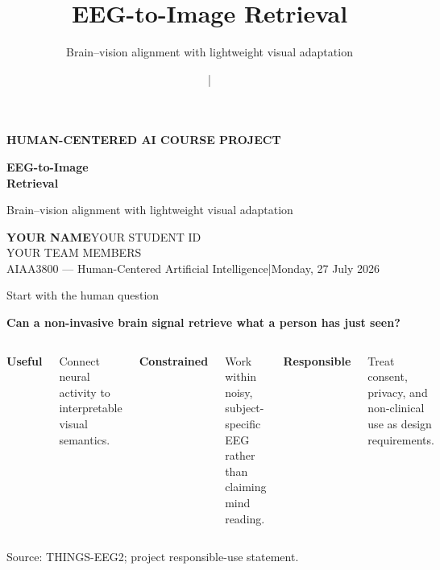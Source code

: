\documentclass[aspectratio=169,11pt]{beamer}
\title{EEG-to-Image Retrieval}
\subtitle{Brain--vision alignment with lightweight visual adaptation}
\author{\PresenterName\quad|\quad \StudentID}
\institute{\CourseName\\[0.08cm]\TeamMembers}
\date{\PresentationDate}
\newcommand{\PresenterName}{YOUR NAME}
\newcommand{\StudentID}{YOUR STUDENT ID}
\newcommand{\TeamMembers}{YOUR TEAM MEMBERS}
\newcommand{\CourseName}{AIAA3800 --- Human-Centered Artificial Intelligence}
\newcommand{\PresentationDate}{Monday, 27 July 2026}
\newcommand{\sourcefooter}[1]{%
  \vfill
  {\color{Muted}\fontsize{8.5}{10}\selectfont Source: #1\par}
}
\begin{document}
\begin{frame}[plain]
  \vspace{0.42cm}
  {\color{Teal}\bfseries\fontsize{14}{17}\selectfont HUMAN-CENTERED AI COURSE PROJECT\par}
  \vspace{0.30cm}
  {\color{Navy}\bfseries\fontsize{42}{46}\selectfont EEG-to-Image\\Retrieval\par}
  \vspace{0.18cm}
  {\color{Muted}\fontsize{18}{22}\selectfont Brain--vision alignment with lightweight visual adaptation\par}
  \vfill
  {\fontsize{12}{15}\selectfont
    \textbf{\PresenterName}\quad \StudentID\\[0.08cm]
    \TeamMembers\\[0.10cm]
    \CourseName\quad|\quad\PresentationDate
  }
  \vspace{0.35cm}
\end{frame}


\begin{frame}{Start with the human question}
  \vspace{0.35cm}
  {\color{Navy}\bfseries\fontsize{22}{27}\selectfont
    Can a non-invasive brain signal retrieve what a person has just seen?
  \par}
  \vspace{0.55cm}

  \begin{columns}[T,onlytextwidth]
      {\color{Blue}\bfseries\fontsize{20}{24}\selectfont Useful\par}
      \vspace{0.12cm}
      {\fontsize{14}{18}\selectfont Connect neural activity to interpretable visual semantics.}

      {\color{Teal}\bfseries\fontsize{20}{24}\selectfont Constrained\par}
      \vspace{0.12cm}
      {\fontsize{14}{18}\selectfont Work within noisy, subject-specific EEG rather than claiming mind reading.}

      {\color{Orange}\bfseries\fontsize{20}{24}\selectfont Responsible\par}
      \vspace{0.12cm}
      {\fontsize{14}{18}\selectfont Treat consent, privacy, and non-clinical use as design requirements.}
  \end{columns}

  \sourcefooter{THINGS-EEG2; project responsible-use statement.}
\end{frame}
\end{document}
